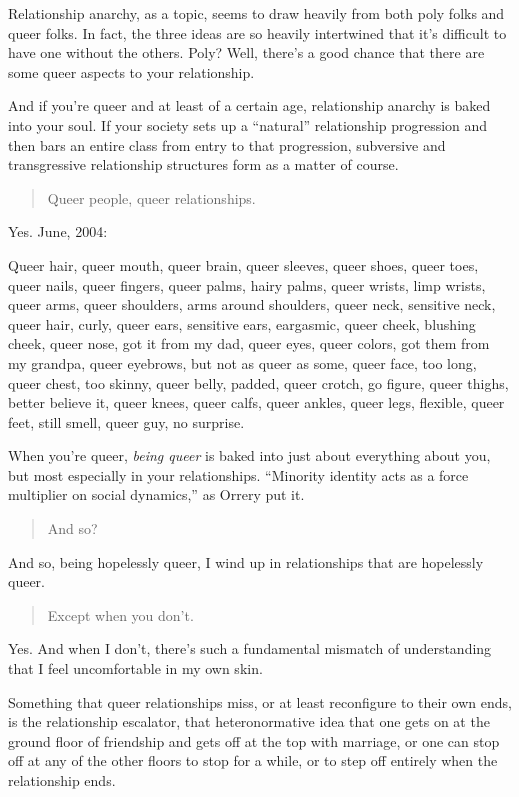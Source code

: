 Relationship anarchy, as a topic, seems to draw heavily from both poly folks and queer folks. In fact, the three ideas are so heavily intertwined that it's difficult to have one without the others. Poly? Well, there's a good chance that there are some queer aspects to your relationship.

And if you're queer and at least of a certain age, relationship anarchy is baked into your soul. If your society sets up a ``natural'' relationship progression and then bars an entire class from entry to that progression, subversive and transgressive relationship structures form as a matter of course.

\begin{quote}
Queer people, queer relationships.
\end{quote}

Yes. June, 2004:

Queer hair, queer mouth, queer brain, queer sleeves, queer shoes, queer toes, queer nails, queer fingers, queer palms, hairy palms, queer wrists, limp wrists, queer arms, queer shoulders, arms around shoulders, queer neck, sensitive neck, queer hair, curly, queer ears, sensitive ears, eargasmic, queer cheek, blushing cheek, queer nose, got it from my dad, queer eyes, queer colors, got them from my grandpa, queer eyebrows, but not as queer as some, queer face, too long, queer chest, too skinny, queer belly, padded, queer crotch, go figure, queer thighs, better believe it, queer knees, queer calfs, queer ankles, queer legs, flexible, queer feet, still smell, queer guy, no surprise.

When you're queer, \emph{being queer} is baked into just about everything about you, but most especially in your relationships. ``Minority identity acts as a force multiplier on social dynamics,'' as Orrery put it.

\begin{quote}
And so?
\end{quote}

And so, being hopelessly queer, I wind up in relationships that are hopelessly queer.

\begin{quote}
Except when you don't.
\end{quote}

Yes. And when I don't, there's such a fundamental mismatch of understanding that I feel uncomfortable in my own skin.

Something that queer relationships miss, or at least reconfigure to their own ends, is the relationship escalator, that heteronormative idea that one gets on at the ground floor of friendship and gets off at the top with marriage, or one can stop off at any of the other floors to stop for a while, or to step off entirely when the relationship ends.

